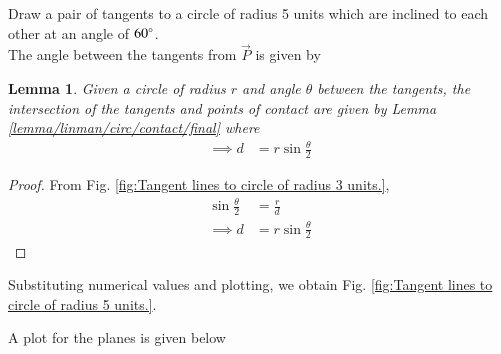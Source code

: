 \documentclass[journal,12pt,twocolumn]{IEEEtran}
\newtheorem{lemma}{Lemma}
\begin{document}
\item Draw a  pair of tangents to a circle of radius 5 units  which are inclined to each other at an angle of $60\degree$.
\\
\solution  The angle between the tangents from $\vec{P}$ is given by 
\begin{lemma}
  Given a circle of radius $r$ and angle $\theta$ between the tangents, the intersection of the tangents and points of contact are
  given by Lemma   \ref{lemma/linman/circ/contact/final}  where 
  \begin{align}
    \implies d &= r\sin \frac{\theta}{2}
  \end{align}
%  
\end{lemma}
\begin{proof}
  From Fig.  \ref{fig:Tangent lines to circle of radius 3 units.},
\begin{align}
  \sin \frac{\theta}{2} &= \frac{r}{d}
  \\
  \implies d &= r\sin \frac{\theta}{2}
\end{align}
\end{proof}
Substituting numerical values and plotting, we obtain Fig. \ref{fig:Tangent lines to circle of radius 5 units.}.


A plot for the planes is given below
\end{document}
